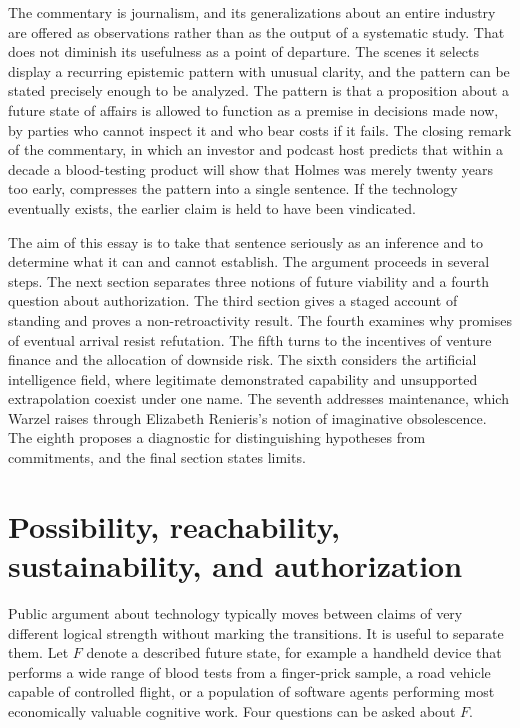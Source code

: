\documentclass[11pt]{article}
\theoremstyle{plain}
\theoremstyle{definition}
\theoremstyle{remark}
\begin{document}
The commentary is journalism, and its generalizations about an entire industry are offered as observations rather than as the output of a systematic study. That does not diminish its usefulness as a point of departure. The scenes it selects display a recurring epistemic pattern with unusual clarity, and the pattern can be stated precisely enough to be analyzed. The pattern is that a proposition about a future state of affairs is allowed to function as a premise in decisions made now, by parties who cannot inspect it and who bear costs if it fails. The closing remark of the commentary, in which an investor and podcast host predicts that within a decade a blood-testing product will show that Holmes was merely twenty years too early, compresses the pattern into a single sentence. If the technology eventually exists, the earlier claim is held to have been vindicated.

The aim of this essay is to take that sentence seriously as an inference and to determine what it can and cannot establish. The argument proceeds in several steps. The next section separates three notions of future viability and a fourth question about authorization. The third section gives a staged account of standing and proves a non-retroactivity result. The fourth examines why promises of eventual arrival resist refutation. The fifth turns to the incentives of venture finance and the allocation of downside risk. The sixth considers the artificial intelligence field, where legitimate demonstrated capability and unsupported extrapolation coexist under one name. The seventh addresses maintenance, which Warzel raises through Elizabeth Renieris's notion of imaginative obsolescence. The eighth proposes a diagnostic for distinguishing hypotheses from commitments, and the final section states limits.

\section{Possibility, reachability, sustainability, and authorization}

Public argument about technology typically moves between claims of very different logical strength without marking the transitions. It is useful to separate them. Let $F$ denote a described future state, for example a handheld device that performs a wide range of blood tests from a finger-prick sample, a road vehicle capable of controlled flight, or a population of software agents performing most economically valuable cognitive work. Four questions can be asked about $F$.
\end{document}
